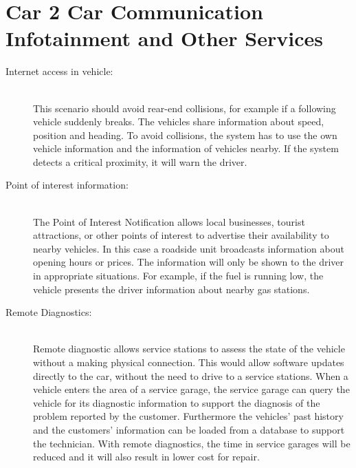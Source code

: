 \section{Car 2 Car Communication Infotainment and Other Services}
\label{sec:C2COtherServices}
\begin{description}
  \item[Internet access in vehicle:] \hfill \\ This scenario should avoid rear-end collisions, for example if a following vehicle suddenly breaks. The vehicles share information about speed, position and heading. To avoid collisions, the system has to use the own vehicle information and the information of vehicles nearby. If the system detects a critical proximity, it will warn the driver.
  \item[Point of interest information:] \hfill \\ The Point of Interest Notification allows local businesses, tourist attractions, or other points of interest to advertise their availability to nearby vehicles. In this case a roadside unit broadcasts information about opening hours or prices. The information will only be shown to the driver in appropriate situations. For example, if the fuel is running low, the vehicle presents the driver information about nearby gas stations.
  \item[Remote Diagnostics:] \hfill \\ Remote diagnostic allows service stations to assess the state of the vehicle without a making physical connection. This would allow software updates directly to the car, without the need to drive to a service stations. When a vehicle enters the area of a service garage, the 
service garage can query the vehicle for its diagnostic information to support the diagnosis of the problem reported by the customer. Furthermore the vehicles' past history and the customers' information can be loaded from a database to support the technician. With remote diagnostics, the time in service garages will be reduced and it will also result in lower cost for repair. 

\end{description}	